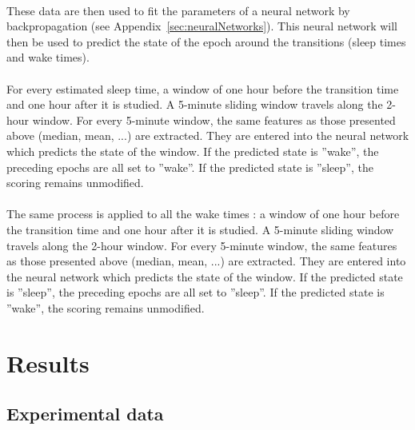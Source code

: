 \documentclass[a4paper,12pt]{article}
\begin{document}
\paragraph{}
These data are then used to fit the parameters of a neural network by backpropagation (see Appendix~\ref{sec:neuralNetworks}). This neural network will then be used to predict the state of the epoch around the transitions (sleep times and wake times).

\paragraph{}
For every estimated sleep time, a window of one hour before the transition time and one hour after it is studied. A 5-minute sliding window travels along the 2-hour window. For every 5-minute window, the same features as those presented above (median, mean, ...) are extracted. They are entered into the neural network which predicts the state of the window. If the predicted state is ''wake'', the preceding epochs are all set to ''wake''. If the predicted state is ''sleep'', the scoring remains unmodified.

\paragraph{}
The same process is applied to all the wake times : a window of one hour before the transition time and one hour after it is studied. A 5-minute sliding window travels along the 2-hour window. For every 5-minute window, the same features as those presented above (median, mean, ...) are extracted. They are entered into the neural network which predicts the state of the window. If the predicted state is ''sleep'', the preceding epochs are all set to ''sleep''. If the predicted state is ''wake'', the scoring remains unmodified.

\newpage

\section{Results}
\label{sec:results}

\subsection{Experimental data}
\label{subsec:expData}
\end{document}
